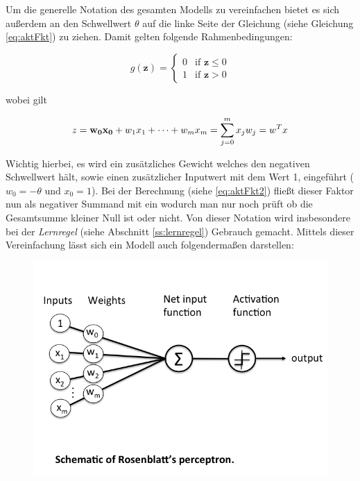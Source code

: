 Um die generelle Notation des gesamten Modells zu vereinfachen bietet es sich außerdem an den Schwellwert $\theta$ auf die linke Seite der Gleichung (siehe Gleichung \ref{eq:aktFkt}) zu ziehen. Damit gelten folgende Rahmenbedingungen:

\begin{equation} \label{eq:aktFkt2}
g(\mathbf{z}) =\begin{cases}
	0 & \mbox{if } \mathbf{z} \leq 0 \\
    1 & \mbox{if } \mathbf{z} > 0
  \end{cases}
\end{equation}

wobei gilt

\begin{equation} \label{eq:vektorprod}
z =  \mathbf{w_0x_{0}} + w_1x_{1} + \dots + w_mx_{m} = \sum_{j=0}^{m} x_{j}w_{j} \\ = w^Tx
\end{equation}

\label{w0Erklaerung}
Wichtig hierbei, es wird ein zusätzliches Gewicht welches den negativen Schwellwert hält, sowie einen zusätzlicher Inputwert mit dem Wert 1, eingeführt ($w_0 = -\theta  \text{ und } x_0=1$). Bei der Berechnung (siehe \autoref{eq:aktFkt2}) fließt dieser Faktor nun als negativer Summand mit ein wodurch man nur noch prüft ob die Gesamtsumme kleiner Null ist oder nicht. Von dieser Notation wird insbesondere bei der \emph{Lernregel} (siehe Abschnitt \ref{ss:lernregel}) Gebrauch gemacht. Mittels dieser Vereinfachung lässt sich ein Modell auch folgendermaßen darstellen:

\begin{figure}[!htb]
	\centering
	\includegraphics[width=.6\linewidth]{img/perceptron_schematisch}
	\label{fig:perc_modelansicht}
\end{figure}

\FloatBarrier

